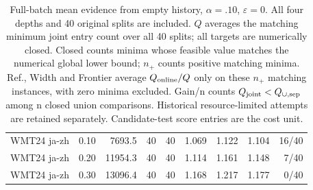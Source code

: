 \begin{table}[t]
\begin{tabular}{lrrrrrrrr}
WMT24 ja-zh & 0.10 & 7693.5 & 40 & 40 & 1.069 & 1.122 & 1.104 & 16/40 \\
WMT24 ja-zh & 0.20 & 11954.3 & 40 & 40 & 1.114 & 1.161 & 1.148 & 7/40 \\
WMT24 ja-zh & 0.30 & 13096.4 & 40 & 40 & 1.168 & 1.217 & 1.177 & 0/40 \\
\bottomrule
\end{tabular}
\caption{Full-batch mean evidence from empty history, $\alpha=.10$, $\varepsilon=0$. All four depths and 40 original splits are included. $Q$ averages the matching minimum joint entry count over all 40 splits; all targets are numerically closed. Closed counts minima whose feasible value matches the numerical global lower bound; $n_+$ counts positive matching minima. Ref., Width and Frontier average $Q_{\rm online}/Q$ only on these $n_+$ matching instances, with zero minima excluded. Gain/n counts $Q_{\rm joint}<Q_{\cup,\rm sep}$ among n closed union comparisons. Historical resource-limited attempts are retained separately. Candidate-test score entries are the cost unit.}
\label{tab:full-mean-exact}
\end{table}
